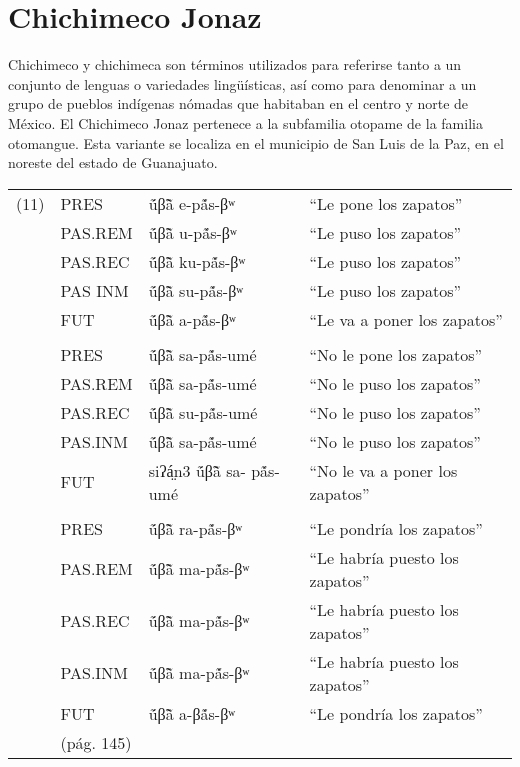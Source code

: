 \section*{Chichimeco Jonaz}

\noindent Chichimeco y chichimeca son términos utilizados para referirse tanto a un conjunto de lenguas o variedades lingüísticas, así como para denominar a un grupo de pueblos indígenas nómadas que habitaban en el centro y norte de México. El Chichimeco Jonaz pertenece a la subfamilia otopame de la familia otomangue. Esta variante se localiza en el municipio de San Luis de la Paz, en el noreste del estado de Guanajuato. \vspace{0.25cm}

{\setmainfont{Doulos SIL}
    \begin{tabular}{llll}
        (11) & PRES       & ṹβ̃ã e-pã́s-βʷ           & “Le pone los zapatos”          \\
             & PAS.REM    & ṹβ̃ã u-pã́s-βʷ           & “Le puso los zapatos”          \\
             & PAS.REC    & ṹβ̃ã ku-pã́s-βʷ          & “Le puso los zapatos”          \\
             & PAS INM    & ṹβ̃ã su-pã́s-βʷ          & “Le puso los zapatos”          \\
             & FUT        & ṹβ̃ã a-pã́s-βʷ           & “Le va a poner los zapatos”    \\
             &            &                        &                                \\
             & PRES       & ṹβ̃ã sa-pã́s-umé         & “No le pone los zapatos”       \\
             & PAS.REM    & ṹβ̃ã sa-pã́s-umé         & “No le puso los zapatos”       \\
             & PAS.REC    & ṹβ̃ã su-pã́s-umé         & “No le puso los zapatos”       \\
             & PAS.INM    & ṹβ̃ã sa-pã́s-umé         & “No le puso los zapatos”       \\
             & FUT        & siʔá̤n3 ṹβ̃ã sa- pã́s-umé & “No le va a poner los zapatos” \\
             &            &                        &                                \\
             & PRES       & ṹβ̃ã ra-pã́s-βʷ          & “Le pondría los zapatos”       \\
             & PAS.REM    & ṹβ̃ã ma-pã́s-βʷ          & “Le habría puesto los zapatos” \\
             & PAS.REC    & ṹβ̃ã ma-pã́s-βʷ          & “Le habría puesto los zapatos” \\
             & PAS.INM    & ṹβ̃ã ma-pã́s-βʷ          & “Le habría puesto los zapatos” \\
             & FUT        & ṹβ̃ã a-βã́s-βʷ           & “Le pondría los zapatos”       \\
             & (pág. 145) &                        &                                \\
    \end{tabular}
} \vspace{0.25cm}

